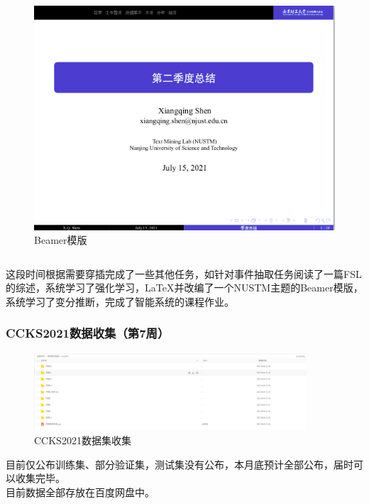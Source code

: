 \documentclass[10pt,aspectratio=43,mathserif]{beamer}
\begin{document}
\begin{frame}
\begin{columns}[b]
                \begin{figure}
                    \centering
                    \includegraphics[width=1.1\textwidth]{figures/latex.png}
                    \caption{Beamer模版}
                    \label{fig:beamer}
                \end{figure}

            \end{columns}
            这段时间根据需要穿插完成了一些其他任务，如针对事件抽取任务阅读了一篇FSL的综述，系统学习了强化学习，\LaTeX 并改编了一个NUSTM主题的Beamer模版，系统学习了变分推断，完成了智能系统的课程作业。
		\end{frame}
		
        \begin{frame}
		  \frametitle{\textbf{CCKS2021数据收集（第7周）}}
			\begin{figure}[!t]
            \centering
            \includegraphics[width=4in]{figures/ccks.png}
            \caption{CCKS2021数据集收集}
            \label{fig:ccks}
            \end{figure}
            目前仅公布训练集、部分验证集，测试集没有公布，本月底预计全部公布，届时可以收集完毕。\\
            目前数据全部存放在百度网盘中。
		\end{frame}
		
\end{document}
